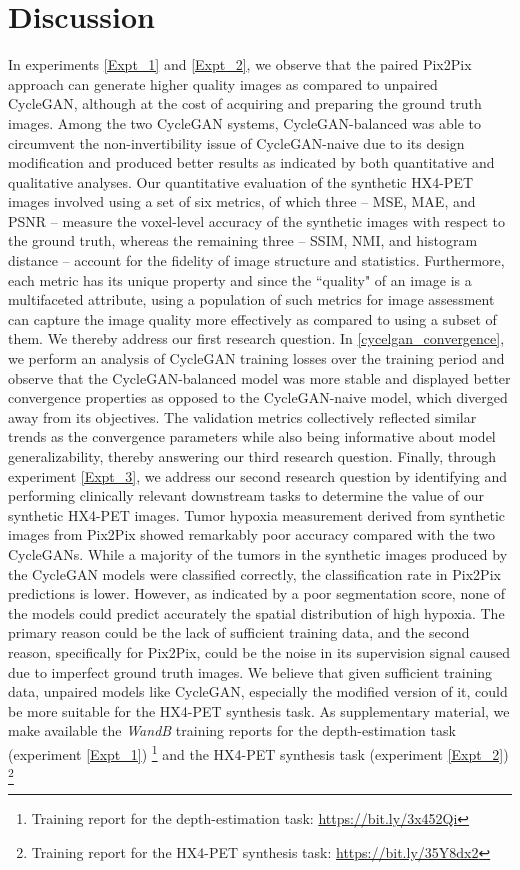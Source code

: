 \chapter{Discussion}
\label{Discussion}

In experiments \ref{Expt_1} and \ref{Expt_2}, we observe that the paired Pix2Pix approach can generate higher quality images as compared to unpaired CycleGAN, although at the cost of acquiring and preparing the ground truth images. Among the two CycleGAN systems, CycleGAN-balanced was able to circumvent the non-invertibility issue of CycleGAN-naive due to its design modification and produced better results as indicated by both quantitative and qualitative analyses. Our quantitative evaluation of the synthetic HX4-PET images involved using a set of six metrics, of which three -- MSE, MAE, and PSNR -- measure the voxel-level accuracy of the synthetic images with respect to the ground truth, whereas the remaining three -- SSIM, NMI, and histogram distance -- account for the fidelity of image structure and statistics. Furthermore, each metric has its unique property and since the ``quality" of an image is a multifaceted attribute, using a population of such metrics for image assessment can capture the image quality more effectively as compared to using a subset of them. We thereby address our first research question. In \ref{cycelgan_convergence}, we perform an analysis of CycleGAN training losses over the training period and observe that the CycleGAN-balanced model was more stable and displayed better convergence properties as opposed to the CycleGAN-naive model, which diverged away from its objectives. The validation metrics collectively reflected similar trends as the convergence parameters while also being informative about model generalizability, thereby answering our third research question. Finally, through experiment \ref{Expt_3}, we address our second research question by identifying and performing clinically relevant downstream tasks to determine the value of our synthetic HX4-PET images. Tumor hypoxia measurement derived from synthetic images from Pix2Pix showed remarkably poor accuracy compared with the two CycleGANs. While a majority of the tumors in the synthetic images produced by the CycleGAN models were classified correctly, the classification rate in Pix2Pix predictions is lower. However, as indicated by a poor segmentation score, none of the models could predict accurately the spatial distribution of high hypoxia. The primary reason could be the lack of sufficient training data, and the second reason, specifically for Pix2Pix, could be the noise in its supervision signal caused due to imperfect ground truth images. We believe that given sufficient training data, unpaired models like CycleGAN, especially the modified version of it, could be more suitable for the HX4-PET synthesis task. As supplementary material, we make available the \textit{WandB} training reports for the depth-estimation task (experiment \ref{Expt_1}) \footnote{Training report for the depth-estimation task: \url{https://bit.ly/3x452Qi}} and the HX4-PET synthesis task (experiment \ref{Expt_2}) \footnote{Training report for the HX4-PET synthesis task: \url{https://bit.ly/35Y8dx2}} 